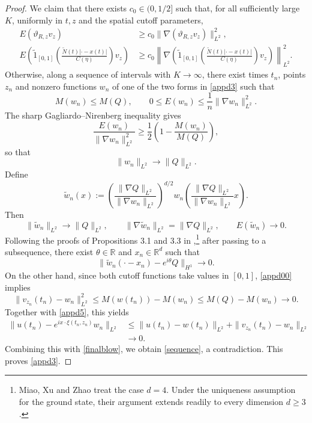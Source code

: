 \documentclass[reqno,11pt]{amsart}
\theoremstyle{plain}
\theoremstyle{definition}
\numberwithin{equation}{section}
\numberwithin{theorem}{section}
\def\geq{\geqslant}
\def\leq{\leqslant}
\def\R{\mathbb{R}}
\begin{document}
\begin{proof}
We claim that there exists $c_0\in(0,1/2]$ such that, for all
sufficiently large $K$, uniformly in $t,z$ and the spatial cutoff parameters,
\begin{equation}\label{appd3}
\begin{split}
 E(\vartheta_{R,z}v_z)
 &\geq c_0\|\nabla(\vartheta_{R,z}v_z)\|_{L^2}^2,\\
 E\left(\tilde{1}_{[0,1]}
       \left(\frac{\tilde N(t)|\cdot-x(t)|}{C(\eta)}\right)v_z\right)
 &\geq c_0\left\|\nabla\left(\tilde{1}_{[0,1]}
       \left(\frac{\tilde N(t)|\cdot-x(t)|}{C(\eta)}\right)v_z\right)
       \right\|_{L^2}^2.
\end{split}
\end{equation}
Otherwise, along a sequence of intervals with $K\to\infty$, there exist
times $t_n$, points $z_n$ and nonzero functions $w_n$ of one of the two
forms in \eqref{appd3} such that
\begin{equation}\label{appd0}
 M(w_n)\leq M(Q),\qquad
 0\leq E(w_n)\leq\frac1n\|\nabla w_n\|_{L^2}^2.
\end{equation}
The sharp Gagliardo--Nirenberg inequality gives
\[
 \frac{E(w_n)}{\|\nabla w_n\|_{L^2}^2}
 \geq\frac12\left(1-\frac{M(w_n)}{M(Q)}\right),
\]
so that
\begin{equation}\label{appd00}
 \|w_n\|_{L^2}\longrightarrow\|Q\|_{L^2}.
\end{equation}
Define
\[
 \tilde w_n(x):=
 \left(\frac{\|\nabla Q\|_{L^2}}{\|\nabla w_n\|_{L^2}}\right)^{d/2}
 w_n\left(\frac{\|\nabla Q\|_{L^2}}{\|\nabla w_n\|_{L^2}}x\right).
\]
Then
\[
 \|\tilde w_n\|_{L^2}\to\|Q\|_{L^2},\qquad
 \|\nabla\tilde w_n\|_{L^2}=\|\nabla Q\|_{L^2},\qquad
 E(\tilde w_n)\to0.
\]
Following the proofs of Propositions 3.1 and 3.3 in \cite{MiaoXuZhaoblowup},\footnote{Miao, Xu
and Zhao treat the case $d=4$. Under the uniqueness assumption for the
ground state, their argument extends readily to every dimension $d\geq3$.}
after passing to a subsequence, there exist $\theta\in\R$ and $x_n\in\R^d$
such that
\begin{equation}\label{finalblow}
 \|\tilde w_n(\cdot-x_n)-e^{i\theta}Q\|_{H^1}\longrightarrow0.
\end{equation}
On the other hand, since both cutoff functions take values in $[0,1]$,
\eqref{appd00} implies
\begin{equation}\label{appd4}
 \|v_{z_n}(t_n)-w_n\|_{L^2}^2
 \leq M(w(t_n))-M(w_n)\leq M(Q)-M(w_n)\longrightarrow0.
\end{equation}
Together with \eqref{appd5}, this yields
\begin{align*}
 \|u(t_n)-e^{ix\cdot\xi(t_n,z_n)}w_n\|_{L^2}
 &\leq\|u(t_n)-w(t_n)\|_{L^2}
       +\|v_{z_n}(t_n)-w_n\|_{L^2}\\
 &\longrightarrow0.
\end{align*}
Combining this with \eqref{finalblow}, we obtain \eqref{sequence},
a contradiction. This proves \eqref{appd3}.


\end{proof}
\end{document}
